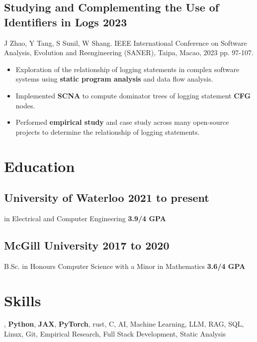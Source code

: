 \documentclass[10pt,letterpaper]{article}
\newcommand{\datedsubsection}[2]{\subsection[#1]{#1 \hfill #2}}
\renewcommand{\emph}[1]{{\color{emphcolor}\bfseries#1}}
\begin{document}
\datedsubsection{Studying and Complementing the Use of Identifiers in Logs}{2023}
\noindent J Zhao, Y Tang, S Sunil, W Shang. IEEE International Conference on Software Analysis, Evolution and Reengineering (SANER), Taipa, Macao,
2023 pp. 97-107.
\begin{itemize}
    \item Exploration of the relationship of logging statements in complex
    software systems using \emph{static program analysis} and data flow analysis.
    \item Implemented \emph{SCNA} to compute dominator trees of logging statement \emph{CFG} nodes.
    \item Performed \emph{empirical study} and case study across many open-source
    projects to determine the relationship of logging statements.
\end{itemize}

\section{Education}

\datedsubsection{\emph{University of Waterloo}}{2021 to present}
\noindent \emph{Ph.D.} in Electrical and Computer Engineering \emph{3.9/4 GPA}

\datedsubsection{\emph{McGill University}}{2017 to 2020}
\noindent B.Sc. in Honours Computer Science with a Minor in Mathematics \emph{3.6/4 GPA}

\section{Skills}
\vspace{1pt}
\noindent \emph{C++20}, \emph{Python}, \emph{JAX}, \emph{PyTorch}, rust, C, AI, Machine Learning, LLM, RAG, SQL, Linux, Git, Empirical Research, Full Stack Development, Static Analysis
\end{document}
